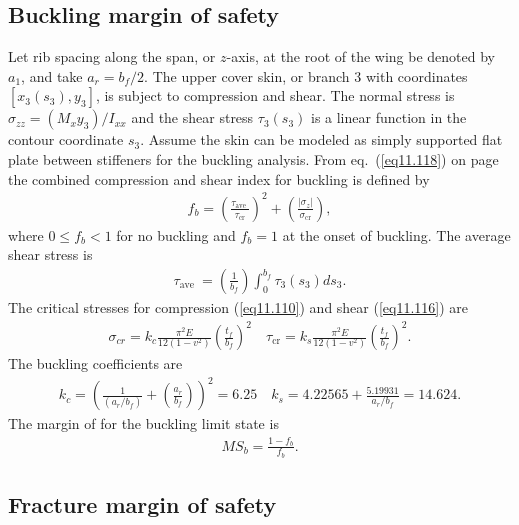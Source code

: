 \documentclass{AeroStructure-ERJohnson}
\begin{document}
\subsection{Buckling margin of safety}\label{sec14.3.1}

Let rib spacing along the span, or $z$-axis, at the root of the wing be denoted by $a_{1}$, and take $a_{r}=b_{f}/2$. The upper cover skin, or branch 3 with coordinates $[x_{3}(s_{3}), y_{3}]$, is subject to compression and shear. The normal stress is $\sigma_{z z}=\left(M_{x} y_{3}\right)/I_{x x}$ and the shear stress $\tau_{3}\left(s_{3}\right)$ is a linear function in the contour coordinate $s_3$. Assume the skin can be modeled as simply supported flat plate between stiffeners for the buckling analysis. From eq.~(\ref{eq11.118}) on page \pageref{eq11.118} the combined compression and shear index for buckling is defined by
\begin{align}\label{eq14.36}
f_{b}=\left(\frac{\tau_{\text{ave }}}{\tau_{\mathrm{cr}}}\right)^{2}+\left(\frac{\left|\sigma_{z}\right|}{\sigma_{\mathrm{cr}}}\right),
\end{align}
where $0 \leq f_{b}<1$ for no buckling and $f_{b}=1$ at the onset of buckling. The average shear stress is
\begin{align}\label{eq14.37}
\tau_{\text{ave }}=\left(\frac{1}{b_f}\right) \int_{0}^{b_{f}} \tau_{3}\left(s_{3}\right) d s_{3}.
\end{align}
The critical stresses for compression (\ref{eq11.110}) and shear (\ref{eq11.116}) are
\begin{align}\label{eq14.38}
\sigma_{c r}=k_{c} \frac{\pi^{2} E}{12\left(1-v^{2}\right)}\left(\frac{t_{f}}{b_f}\right)^{2} \quad \tau_{\mathrm{cr}}=k_{s} \frac{\pi^{2} E}{12\left(1-v^{2}\right)}\left(\frac{t_{f}}{b_f}\right)^{2}.
\end{align}
The buckling coefficients are
\begin{align}\label{eq14.39}
k_{c}=\left(\frac{1}{\left(a_{r}/b_{f}\right)}+\left(\frac{a_{r}}{b_{f}}\right)\right)^{2}=6.25 \quad k_{s}=4.22565+\frac{5.19931}{a_{r}/b_{f}}=14.624.
\end{align}
The margin of for the buckling limit state is
\begin{align}\label{eq14.40}
M S_{b}=\frac{1-f_{b}}{f_{b}}.
\end{align}

\subsection{Fracture margin of safety}\label{sec14.3.2}
\end{document}
